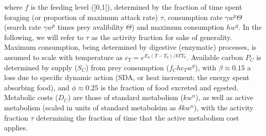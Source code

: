 \documentclass{article}
\begin{document}
where $f$ is the feeding level ([0,1]), determined by the fraction of time spent foraging (or proportion of maximum attack rate) $\tau$, consumption rate $\gamma w^p \Theta$ (search rate $\gamma w^p$ times prey avalibility $\Theta$) and maximum consumption $h w^q$. In the following, we will refer to $\tau$ as the activity fraction for sake of generality. Maximum consumption, being determined by digestive (enzymatic) processes, is assumed to scale with temperature as $c_T = e^{E_a(T-T_0)/kTT_0}$. Available carbon $P_C$ is determined by supply ($S_C$) from prey consumption ($f_C h c_T w^q$), with $\beta \approx 0.15$ a loss due to specific dynamic action (SDA, or heat increment; the energy spent absorbing food), and $\phi \approx 0.25$ is the fraction of food excreted and egested. Metabolic costs ($D_C$) are those of standard metabolism ($k w^n$), as well as active metabolism (scaled in units of standard metabolsim as $\delta k w^n$), with the activity fraction $\tau$ determining the fraction of time that the active metabolism cost applies.  
\end{document}
